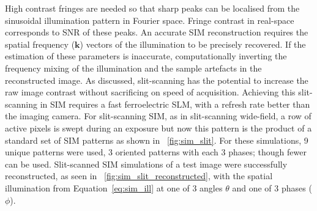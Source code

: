High contrast fringes are needed so that sharp peaks can be localised from the sinusoidal illumination pattern in Fourier space.
Fringe contrast in real-space corresponds to \gls{SNR} of these peaks.
An accurate \gls{SIM} reconstruction requires the spatial frequency (\(\mathbf{k}\)) vectors of the illumination to be precisely recovered.
If the estimation of these parameters is inaccurate, computationally inverting the frequency mixing of the illumination and the sample artefacts in the reconstructed image.
As discussed, \gls{slit-scanning} has the potential to increase the raw image contrast without sacrificing on speed of acquisition.
Achieving this slit-scanning in \gls{SIM} requires a fast ferroelectric \gls{SLM}, with a refresh rate better than the imaging camera.
For slit-scanning \gls{SIM}, as in slit-scanning \gls{wide-field}, a row of active pixels is swept during an exposure but now this pattern is the product of a standard set of \gls{SIM} patterns as shown in \figurename~\ref{fig:sim_slit}.
For these simulations, 9 unique patterns were used, 3 oriented patterns with each 3 phases; though fewer can be used\cite{strohlSpeedLimitsStructured2017}.
Slit-scanned \gls{SIM} simulations of a test image were successfully reconstructed, as seen in \figurename~\ref{fig:sim_slit_reconstructed}, with the spatial illumination from Equation~\eqref{eq:sim_ill} at one of 3 angles \(\theta \) and one of 3 phases (\(\phi \)).
